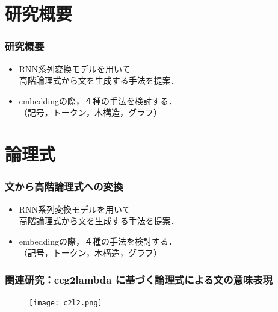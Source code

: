 \documentclass[dvipdfmx]{beamer}
\begin{document}
\section{研究概要}
\begin{frame}
\frametitle{研究概要}
\begin{center}
\end{center}

\begin{itemize}
  \item RNN系列変換モデルを用いて\\高階論理式から文を生成する手法を提案．
  \item embeddingの際，４種の手法を検討する．\\（記号，トークン，木構造，グラフ）　
\end{itemize}


\end{frame}


\section{論理式}
\begin{frame}
\frametitle{文から高階論理式への変換}
\begin{center}
\end{center}

\begin{itemize}
  \item RNN系列変換モデルを用いて\\{\color{berry}高階論理式}から文を生成する手法を提案．
  \item embeddingの際，４種の手法を検討する．\\（記号，トークン，木構造，グラフ）　
\end{itemize}

\end{frame}


\begin{frame}
\frametitle{関連研究：ccg2lambda に基づく論理式による文の意味表現}
\begin{center}
\begin{figure}[h]
	\texttt{[image: c2l2.png]}
        \label{fig:c2l}
\end{figure}
\end{center}

\end{frame}
\end{document}

